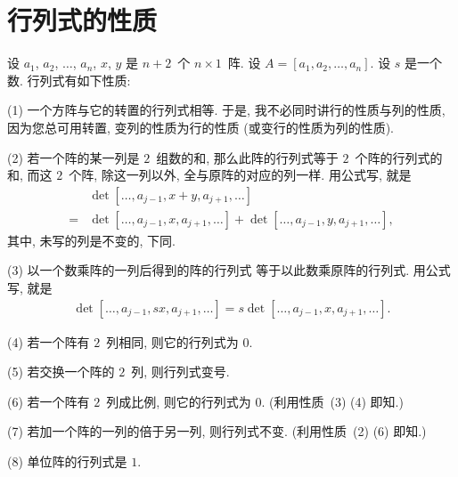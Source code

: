 \documentclass[../libro.tex]{subfiles}
\begin{document}

\section{行列式的性质}


设 \(a_1\), \(a_2\), \(\dots\), \(a_n\), \(x\), \(y\)
是 \(n+2\)~个 \(n \times 1\)~阵.
设 \(A = [a_1, a_2, \dots, a_n]\).
设 \(s\) 是一个数.
行列式有如下性质:

\vspace{2ex}

(1)
一个方阵与它的转置的行列式相等.
于是, 我不必同时讲行的性质与列的性质,
因为您总可用转置,
变列的性质为行的性质
(或变行的性质为列的性质).

(2)
若一个阵的某一列是 \(2\)~组数的和,
那么此阵的行列式等于 \(2\)~个阵的行列式的和,
而这 \(2\)~个阵, 除这一列以外, 全与原阵的对应的列一样.
用公式写, 就是
\begin{align*}
    & \det {[\dots, a_{j-1}, x + y, a_{j+1}, \dots]}
    \\
    = {} & \det {[\dots, a_{j-1}, x, a_{j+1}, \dots]}
    + \det {[\dots, a_{j-1}, y, a_{j+1}, \dots]},
\end{align*}
其中, 未写的列是不变的, 下同.

(3)
以一个数乘阵的一列后得到的阵的行列式%
等于以此数乘原阵的行列式.
用公式写, 就是
\begin{align*}
    \det {[\dots, a_{j-1}, sx, a_{j+1}, \dots]}
    = s \det {[\dots, a_{j-1}, x, a_{j+1}, \dots]}.
\end{align*}

(4)
若一个阵有 \(2\)~列相同, 则它的行列式为 \(0\).

(5)
若交换一个阵的 \(2\)~列, 则行列式变号.

(6)
若一个阵有 \(2\)~列成比例, 则它的行列式为 \(0\).
(利用性质~(3) (4) 即知.)

(7)
若加一个阵的一列的倍于另一列, 则行列式不变.
(利用性质~(2) (6) 即知.)

(8)
单位阵的行列式是 \(1\).
\end{document}
